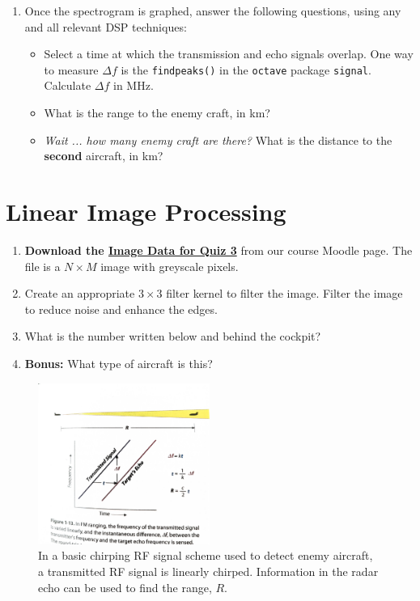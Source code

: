 \documentclass{article}
\begin{document}
\begin{enumerate}
\item Once the spectrogram is graphed, answer the following questions, using any and all relevant DSP techniques:
\begin{itemize}
\item Select a time at which the transmission and echo signals overlap.  One way to measure $\Delta f$ is the \verb+findpeaks()+ in the \verb+octave+ package \verb+signal+. Calculate $\Delta f$ in MHz.
\item What is the range to the enemy craft, in km?
\item \textit{Wait ... how many enemy craft are there?} What is the distance to the \textbf{second} aircraft, in km?
\end{itemize}
\end{enumerate}

\vspace{3cm}

\section{Linear Image Processing}

\begin{enumerate}
\item \textbf{Download the \textbf{\href{https://cms.whittier.edu/mod/resource/view.php?id=683189}{Image Data for Quiz 3}}} from our course Moodle page.  The file is a $N \times M$ image with greyscale pixels.
\item Create an appropriate $3 \times 3$ filter kernel to filter the image.  Filter the image to reduce noise and enhance the edges.
\item What is the number written below and behind the cockpit?
\item \textbf{Bonus:} What type of aircraft is this?
\end{enumerate}

\begin{figure}
\centering
\includegraphics[width=0.5\textwidth,trim=2cm 6cm 2cm 3cm,clip=true]{radar.pdf}
\caption{\label{fig:1} In a basic chirping RF signal scheme used to detect enemy aircraft, a transmitted RF signal is linearly chirped.  Information in the radar echo can be used to find the range, $R$.}
\end{figure}
\end{document}
